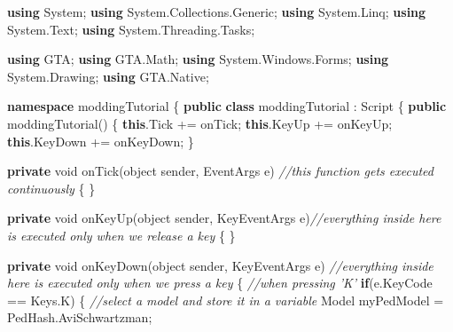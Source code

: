 \documentclass[
  openany]{book}
\newenvironment{Shaded}{\begin{snugshade}}{\end{snugshade}}
\newcommand{\CommentTok}[1]{\textcolor[rgb]{0.56,0.35,0.01}{\textit{#1}}}
\newcommand{\DataTypeTok}[1]{\textcolor[rgb]{0.13,0.29,0.53}{#1}}
\newcommand{\FunctionTok}[1]{\textcolor[rgb]{0.00,0.00,0.00}{#1}}
\newcommand{\KeywordTok}[1]{\textcolor[rgb]{0.13,0.29,0.53}{\textbf{#1}}}
\newcommand{\NormalTok}[1]{#1}
\begin{document}
\begin{Shaded}
\begin{Highlighting}[]
\KeywordTok{using}\NormalTok{ System;}
\KeywordTok{using}\NormalTok{ System.}\FunctionTok{Collections}\NormalTok{.}\FunctionTok{Generic}\NormalTok{;}
\KeywordTok{using}\NormalTok{ System.}\FunctionTok{Linq}\NormalTok{;}
\KeywordTok{using}\NormalTok{ System.}\FunctionTok{Text}\NormalTok{;}
\KeywordTok{using}\NormalTok{ System.}\FunctionTok{Threading}\NormalTok{.}\FunctionTok{Tasks}\NormalTok{;}
 
\KeywordTok{using}\NormalTok{ GTA;}
\KeywordTok{using}\NormalTok{ GTA.}\FunctionTok{Math}\NormalTok{;}
\KeywordTok{using}\NormalTok{ System.}\FunctionTok{Windows}\NormalTok{.}\FunctionTok{Forms}\NormalTok{;}
\KeywordTok{using}\NormalTok{ System.}\FunctionTok{Drawing}\NormalTok{;}
\KeywordTok{using}\NormalTok{ GTA.}\FunctionTok{Native}\NormalTok{;}
 
 
\KeywordTok{namespace}\NormalTok{ moddingTutorial}
\NormalTok{\{}
    \KeywordTok{public} \KeywordTok{class}\NormalTok{ moddingTutorial : Script}
\NormalTok{    \{}
        \KeywordTok{public} \FunctionTok{moddingTutorial}\NormalTok{()}
\NormalTok{        \{}
            \KeywordTok{this}\NormalTok{.}\FunctionTok{Tick}\NormalTok{ += onTick;}
            \KeywordTok{this}\NormalTok{.}\FunctionTok{KeyUp}\NormalTok{ += onKeyUp;}
            \KeywordTok{this}\NormalTok{.}\FunctionTok{KeyDown}\NormalTok{ += onKeyDown;}
\NormalTok{        \}}
 
        \KeywordTok{private} \DataTypeTok{void} \FunctionTok{onTick}\NormalTok{(}\DataTypeTok{object}\NormalTok{ sender, EventArgs e) }\CommentTok{//this function gets executed continuously }
\NormalTok{        \{}
\NormalTok{        \}}
 
        \KeywordTok{private} \DataTypeTok{void} \FunctionTok{onKeyUp}\NormalTok{(}\DataTypeTok{object}\NormalTok{ sender, KeyEventArgs e)}\CommentTok{//everything inside here is executed only when we release a key}
\NormalTok{        \{}
\NormalTok{        \}}
 
        \KeywordTok{private} \DataTypeTok{void} \FunctionTok{onKeyDown}\NormalTok{(}\DataTypeTok{object}\NormalTok{ sender, KeyEventArgs e) }\CommentTok{//everything inside here is executed only when we press a key}
\NormalTok{        \{}
            \CommentTok{//when pressing 'K'}
            \KeywordTok{if}\NormalTok{(e.}\FunctionTok{KeyCode}\NormalTok{ == Keys.}\FunctionTok{K}\NormalTok{)}
\NormalTok{            \{}
                \CommentTok{//select a model and store it in a variable}
\NormalTok{                Model myPedModel = PedHash.}\FunctionTok{AviSchwartzman}\NormalTok{;}
    

\end{Highlighting}
\end{Shaded}
\end{document}
